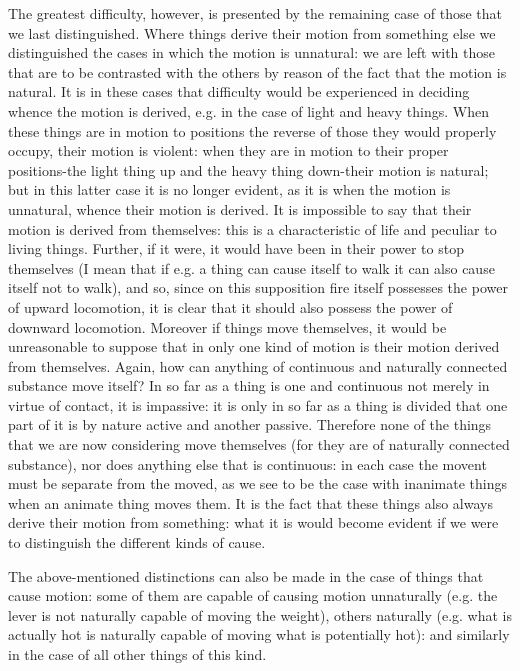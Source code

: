 The greatest difficulty, however, is presented by the remaining case
of those that we last distinguished. Where things derive their motion
from something else we distinguished the cases in which the motion
is unnatural: we are left with those that are to be contrasted with
the others by reason of the fact that the motion is natural. It is
in these cases that difficulty would be experienced in deciding whence
the motion is derived, e.g. in the case of light and heavy things.
When these things are in motion to positions the reverse of those
they would properly occupy, their motion is violent: when they are
in motion to their proper positions-the light thing up and the heavy
thing down-their motion is natural; but in this latter case it is
no longer evident, as it is when the motion is unnatural, whence their
motion is derived. It is impossible to say that their motion is derived
from themselves: this is a characteristic of life and peculiar to
living things. Further, if it were, it would have been in their power
to stop themselves (I mean that if e.g. a thing can cause itself to
walk it can also cause itself not to walk), and so, since on this
supposition fire itself possesses the power of upward locomotion,
it is clear that it should also possess the power of downward locomotion.
Moreover if things move themselves, it would be unreasonable to suppose
that in only one kind of motion is their motion derived from themselves.
Again, how can anything of continuous and naturally connected substance
move itself? In so far as a thing is one and continuous not merely
in virtue of contact, it is impassive: it is only in so far as a thing
is divided that one part of it is by nature active and another passive.
Therefore none of the things that we are now considering move themselves
(for they are of naturally connected substance), nor does anything
else that is continuous: in each case the movent must be separate
from the moved, as we see to be the case with inanimate things when
an animate thing moves them. It is the fact that these things also
always derive their motion from something: what it is would become
evident if we were to distinguish the different kinds of cause.

The above-mentioned distinctions can also be made in the case of things
that cause motion: some of them are capable of causing motion unnaturally
(e.g. the lever is not naturally capable of moving the weight), others
naturally (e.g. what is actually hot is naturally capable of moving
what is potentially hot): and similarly in the case of all other things
of this kind. 

